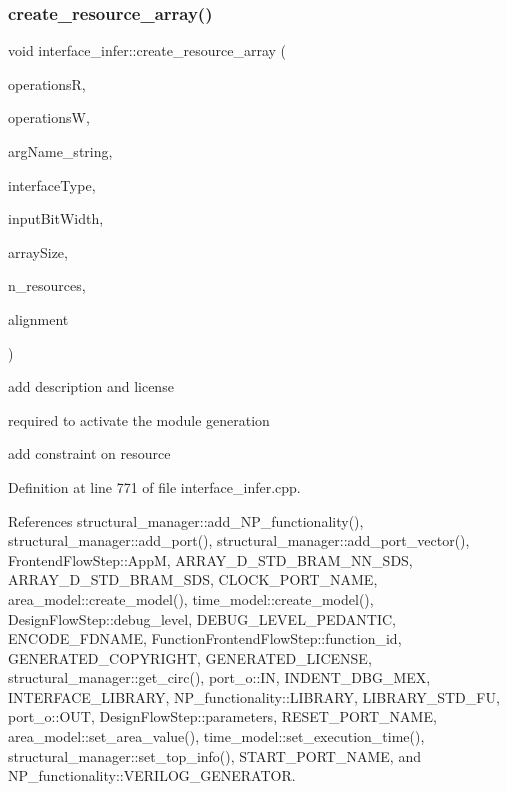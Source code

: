 \subsubsection{\texorpdfstring{create\+\_\+resource\+\_\+array()}{create\_resource\_array()}}
{\footnotesize\ttfamily void interface\+\_\+infer\+::create\+\_\+resource\+\_\+array (\begin{DoxyParamCaption}\item[{const std\+::vector$<$ std\+::string $>$ \&}]{operationsR,  }\item[{const std\+::vector$<$ std\+::string $>$ \&}]{operationsW,  }\item[{const std\+::string \&}]{arg\+Name\+\_\+string,  }\item[{const std\+::string \&}]{interface\+Type,  }\item[{unsigned int}]{input\+Bit\+Width,  }\item[{unsigned int}]{array\+Size,  }\item[{unsigned}]{n\+\_\+resources,  }\item[{unsigned}]{alignment }\end{DoxyParamCaption})\hspace{0.3cm}{\ttfamily [private]}}

add description and license

required to activate the module generation

add constraint on resource 

Definition at line 771 of file interface\+\_\+infer.\+cpp.



References structural\+\_\+manager\+::add\+\_\+\+N\+P\+\_\+functionality(), structural\+\_\+manager\+::add\+\_\+port(), structural\+\_\+manager\+::add\+\_\+port\+\_\+vector(), Frontend\+Flow\+Step\+::\+AppM, A\+R\+R\+A\+Y\+\_\+D\+\_\+\+S\+T\+D\+\_\+\+B\+R\+A\+M\+\_\+\+N\+N\+\_\+\+S\+DS, A\+R\+R\+A\+Y\+\_\+D\+\_\+\+S\+T\+D\+\_\+\+B\+R\+A\+M\+\_\+\+S\+DS, C\+L\+O\+C\+K\+\_\+\+P\+O\+R\+T\+\_\+\+N\+A\+ME, area\+\_\+model\+::create\+\_\+model(), time\+\_\+model\+::create\+\_\+model(), Design\+Flow\+Step\+::debug\+\_\+level, D\+E\+B\+U\+G\+\_\+\+L\+E\+V\+E\+L\+\_\+\+P\+E\+D\+A\+N\+T\+IC, E\+N\+C\+O\+D\+E\+\_\+\+F\+D\+N\+A\+ME, Function\+Frontend\+Flow\+Step\+::function\+\_\+id, G\+E\+N\+E\+R\+A\+T\+E\+D\+\_\+\+C\+O\+P\+Y\+R\+I\+G\+HT, G\+E\+N\+E\+R\+A\+T\+E\+D\+\_\+\+L\+I\+C\+E\+N\+SE, structural\+\_\+manager\+::get\+\_\+circ(), port\+\_\+o\+::\+IN, I\+N\+D\+E\+N\+T\+\_\+\+D\+B\+G\+\_\+\+M\+EX, I\+N\+T\+E\+R\+F\+A\+C\+E\+\_\+\+L\+I\+B\+R\+A\+RY, N\+P\+\_\+functionality\+::\+L\+I\+B\+R\+A\+RY, L\+I\+B\+R\+A\+R\+Y\+\_\+\+S\+T\+D\+\_\+\+FU, port\+\_\+o\+::\+O\+UT, Design\+Flow\+Step\+::parameters, R\+E\+S\+E\+T\+\_\+\+P\+O\+R\+T\+\_\+\+N\+A\+ME, area\+\_\+model\+::set\+\_\+area\+\_\+value(), time\+\_\+model\+::set\+\_\+execution\+\_\+time(), structural\+\_\+manager\+::set\+\_\+top\+\_\+info(), S\+T\+A\+R\+T\+\_\+\+P\+O\+R\+T\+\_\+\+N\+A\+ME, and N\+P\+\_\+functionality\+::\+V\+E\+R\+I\+L\+O\+G\+\_\+\+G\+E\+N\+E\+R\+A\+T\+OR.



